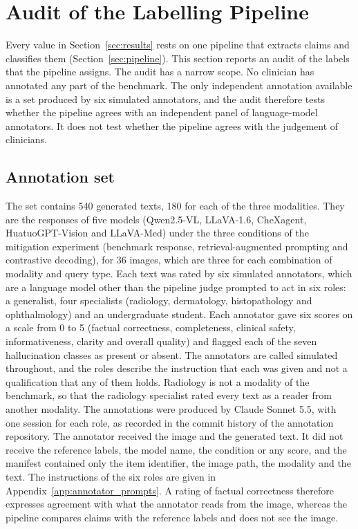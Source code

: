 \documentclass[11pt,a4paper]{article}
\begin{document}
\section{Audit of the Labelling Pipeline}\label{sec:validation}

Every value in Section~\ref{sec:results} rests on one pipeline that extracts claims and classifies them (Section~\ref{sec:pipeline}). This section reports an audit of the labels that the pipeline assigns. The audit has a narrow scope. No clinician has annotated any part of the benchmark. The only independent annotation available is a set produced by six simulated annotators, and the audit therefore tests whether the pipeline agrees with an independent panel of language-model annotators. It does not test whether the pipeline agrees with the judgement of clinicians.

\subsection{Annotation set}\label{sec:val_set}
The set contains 540 generated texts, 180 for each of the three modalities. They are the responses of five models (Qwen2.5-VL, LLaVA-1.6, CheXagent, HuatuoGPT-Vision and LLaVA-Med) under the three conditions of the mitigation experiment (benchmark response, retrieval-augmented prompting and contrastive decoding), for 36 images, which are three for each combination of modality and query type. Each text was rated by six simulated annotators, which are a language model other than the pipeline judge prompted to act in six roles: a generalist, four specialists (radiology, dermatology, histopathology and ophthalmology) and an undergraduate student. Each annotator gave six scores on a scale from 0 to 5 (factual correctness, completeness, clinical safety, informativeness, clarity and overall quality) and flagged each of the seven hallucination classes as present or absent. The annotators are called simulated throughout, and the roles describe the instruction that each was given and not a qualification that any of them holds. Radiology is not a modality of the benchmark, so that the radiology specialist rated every text as a reader from another modality.
The annotations were produced by Claude Sonnet 5.5, with one session for each role, as recorded in the commit history of the annotation repository. The annotator received the image and the generated text. It did not receive the reference labels, the model name, the condition or any score, and the manifest contained only the item identifier, the image path, the modality and the text. The instructions of the six roles are given in Appendix~\ref{app:annotator_prompts}. A rating of factual correctness therefore expresses agreement with what the annotator reads from the image, whereas the pipeline compares claims with the reference labels and does not see the image.
\end{document}
